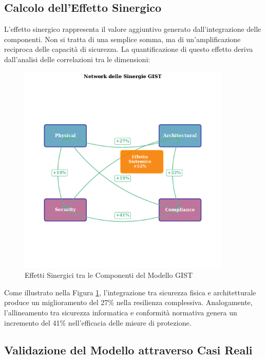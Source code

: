 \subsection{\texorpdfstring{Calcolo dell'Effetto Sinergico}{5.3.1 - Calcolo dell'Effetto Sinergico}}
\label{subsec:5.3.1}

L'effetto sinergico rappresenta il valore aggiuntivo generato dall'integrazione delle componenti. Non si tratta di una semplice somma, ma di un'amplificazione reciproca delle capacità di sicurezza. La quantificazione di questo effetto deriva dall'analisi delle correlazioni tra le dimensioni:

\begin{figure}[htbp]
\centering
\includegraphics[width=0.9\textwidth]{thesis_figures/cap5/figura_5_2_synergies.pdf}

\caption{Effetti Sinergici tra le Componenti del Modello GIST}
\label{fig:synergy_effects}
\end{figure}

Come illustrato nella Figura \ref{fig:synergy_effects}, l'integrazione tra sicurezza fisica e architetturale produce un miglioramento del 27\% nella resilienza complessiva. Analogamente, l'allineamento tra sicurezza informatica e conformità normativa genera un incremento del 41\% nell'efficacia delle misure di protezione.

\subsection{\texorpdfstring{Validazione del Modello attraverso Casi Reali}{5.3.2 - Validazione del Modello attraverso Casi Reali}}
\label{subsec:5.3.2}

